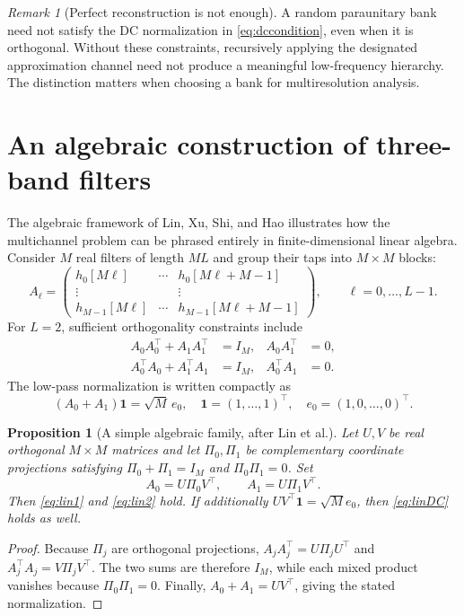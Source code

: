 \documentclass{article}
\newtheorem{proposition}[theorem]{Proposition}
\theoremstyle{definition}
\theoremstyle{remark}
\newtheorem{remark}[theorem]{Remark}
\begin{document}
\begin{remark}[Perfect reconstruction is not enough]
A random paraunitary bank need not satisfy the DC normalization in \eqref{eq:dccondition}, even when it is orthogonal. Without these constraints, recursively applying the designated approximation channel need not produce a meaningful low-frequency hierarchy. The distinction matters when choosing a bank for multiresolution analysis.
\end{remark}

\section{An algebraic construction of three-band filters}
The algebraic framework of Lin, Xu, Shi, and Hao \cite{lin2006} illustrates how the multichannel problem can be phrased entirely in finite-dimensional linear algebra. Consider $M$ real filters of length $ML$ and group their taps into $M\times M$ blocks:
\begin{equation}
 A_\ell=\begin{pmatrix}
 h_0[M\ell]&\cdots&h_0[M\ell+M-1]\\
 \vdots&&\vdots\\
 h_{M-1}[M\ell]&\cdots&h_{M-1}[M\ell+M-1]
 \end{pmatrix},\qquad \ell=0,\ldots,L-1.
\label{eq:blocks}
\end{equation}
For $L=2$, sufficient orthogonality constraints include
\begin{align}
 A_0A_0^\top+A_1A_1^\top&=I_M,& A_0A_1^\top&=0,\label{eq:lin1}\\
 A_0^\top A_0+A_1^\top A_1&=I_M,& A_0^\top A_1&=0.\label{eq:lin2}
\end{align}
The low-pass normalization is written compactly as
\begin{equation}
 (A_0+A_1)\boldsymbol{1}=\sqrt M\,e_0,
 \quad\boldsymbol{1}=(1,\ldots,1)^\top,\quad e_0=(1,0,\ldots,0)^\top.
\label{eq:linDC}
\end{equation}

\begin{proposition}[A simple algebraic family, after Lin et al.]
Let $U,V$ be real orthogonal $M\times M$ matrices and let $\Pi_0,\Pi_1$ be complementary coordinate projections satisfying $\Pi_0+\Pi_1=I_M$ and $\Pi_0\Pi_1=0$. Set
\begin{equation}
A_0=U\Pi_0V^\top,\qquad A_1=U\Pi_1V^\top.
\end{equation}
Then \eqref{eq:lin1} and \eqref{eq:lin2} hold. If additionally $UV^\top\boldsymbol{1}=\sqrt M e_0$, then \eqref{eq:linDC} holds as well.
\end{proposition}
\begin{proof}
Because $\Pi_j$ are orthogonal projections, $A_jA_j^\top=U\Pi_jU^\top$ and $A_j^\top A_j=V\Pi_jV^\top$. The two sums are therefore $I_M$, while each mixed product vanishes because $\Pi_0\Pi_1=0$. Finally, $A_0+A_1=UV^\top$, giving the stated normalization.
\end{proof}
\end{document}
